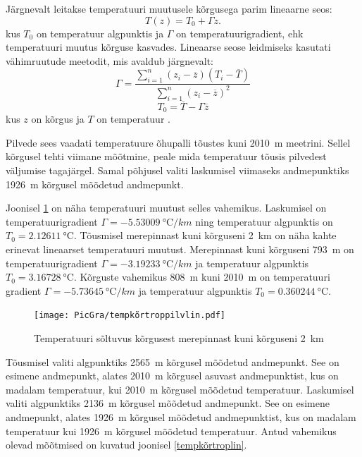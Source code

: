 \documentclass{trkut}%
\begin{document}
Järgnevalt leitakse temperatuuri muutusele kõrgusega parim lineaarne seos:
\begin{equation*}
T(z) = T_0 + \Gamma z.
\end{equation*}
kus $T_0$ on temperatuur algpunktis ja $\Gamma$ on temperatuurigradient, ehk temperatuuri muutus kõrguse kasvades. Lineaarse seose leidmiseks kasutati vähimruutude meetodit, mis avaldub järgnevalt:
\begin{equation*}
\Gamma = \frac{\sum_{i=1}^{n}(z_i - \overline{z})(T_i - \overline{T})}{\sum_{i=1}^{n}(z_i - \overline{z})^2}
\end{equation*}
\begin{equation*}
T_0 = \overline{T} - \Gamma \overline{z}
\end{equation*}
kus $z$ on kõrgus ja $T$ on temperatuur \parencite[252-285]{mat}.

Pilvede sees vaadati temperatuure õhupalli tõustes kuni \SI{2010}{m} meetrini. Sellel kõrgusel tehti viimane mõõtmine, peale mida temperatuur tõusis pilvedest väljumise tagajärgel. Samal põhjusel valiti laskumisel viimaseks andmepunktiks \SI{1926}{m} kõrgusel mõõdetud andmepunkt.

Joonisel \ref{tempkõrtroppilvlin} on näha temperatuuri muutust selles vahemikus. Laskumisel on temperatuurigradient $\Gamma =  \SI{-5.53009}{\degreeCelsius/km}$ ning temperatuur algpunktis on $T_0 = \SI{2.12611}{\degreeCelsius}$. Tõusmisel merepinnast kuni kõrguseni \SI{2}{km} on näha kahte erinevat lineaarset temperatuuri muutust. Merepinnast kuni kõrguseni \SI{793}{m} on temperatuurigradient $\Gamma =\SI{-3.19233}{\degreeCelsius/km}$ ja temperatuur algpunktis $T_0 = \SI{3.16728}{\degreeCelsius}$. Kõrguste vahemikus \SI{808}{m} kuni \SI{2010}{m} on temperatuuri gradient $\Gamma =\SI{-5.73645}{\degreeCelsius/km}$ ja temperatuur algpunktis $T_0 = \SI{0.360244}{\degreeCelsius}$.

\begin{figure}[h]
	\texttt{[image: PicGra/tempkõrtroppilvlin.pdf]}
	\caption{Temperatuuri sõltuvus kõrgusest merepinnast kuni kõrguseni \SI{2}{km}}
	\label{tempkõrtroppilvlin}%
\end{figure}


Tõusmisel valiti algpunktiks \SI{2565}{m} kõrgusel mõõdetud andmepunkt. See on esimene andmepunkt, alates \SI{2010}{m} kõrgusel asuvast andmepunktist, kus on madalam temperatuur, kui \SI{2010}{m} kõrgusel mõõdetud temperatuur. Laskumisel valiti algpunktiks \SI{2136}{m} kõrgusel mõõdetud andmepunkt. See on esimene andmepunkt, alates \SI{1926}{m} kõrgusel mõõdetud andmepunktist, kus on madalam temperatuur kui \SI{1926}{m} kõrgusel mõõdetud temperatuur. Antud vahemikus olevad mõõtmised on kuvatud joonisel \ref{tempkõrtroplin}.
\end{document}
